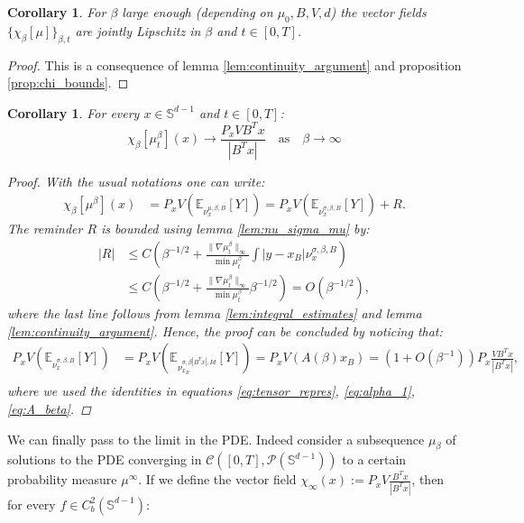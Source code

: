 \documentclass{article}
\numberwithin{theorem}{section}
\newtheorem{corollary}[theorem]{Corollary}
\begin{document}
\begin{corollary}
\label{cor:equilip}
    For $\beta$ large enough (depending on $\mu_0, B, V, d$) the vector fields $\{\chi_\beta[\mu]\}_{\beta,t}$ are jointly Lipschitz in $\beta$ and $t\in[0,T]$.
\end{corollary}
\begin{proof}
    This is a consequence of lemma \ref{lem:continuity_argument} and proposition \ref{prop:chi_bounds}.
\end{proof}

\begin{corollary}
\label{cor:pointwise_limit}
 For every $x\in \mathbb{S}^{d-1}$ and $t\in [0,T]$:
 $$
 \chi_\beta[\mu^\beta_t](x)\to \frac{P_x V B^Tx}{|B^Tx|}\quad \text{as}\quad \beta\to\infty
 $$
 \begin{proof}
     With the usual notations one can write:
     \begin{align*}
         \chi_\beta[\mu^\beta](x)&=P_xV\left( \mathbb{E}_{\nu_x^{\mu,\beta, B}} [Y]\right)= P_xV\left( \mathbb{E}_{\nu_x^{\sigma,\beta, B}} [Y]\right)+R.
     \end{align*}
     The reminder $R$ is bounded using lemma \ref{lem:nu_sigma_mu} by:
          \begin{align*}
       |R|&\leq C\left(\beta^{-1/2}+\frac{\|\nabla \mu^\beta_t\|_\infty}{\min \mu^\beta_t}\int |y-x_B| \nu_x^{\sigma,\beta, B}\right)\\
       &\leq C\left(\beta^{-1/2}+\frac{\|\nabla \mu^\beta_t\|_\infty}{\min \mu^\beta_t}\beta^{-1/2}\right)=O(\beta^{-1/2}),
     \end{align*}
     where the last line follows from lemma \ref{lem:integral_estimates} and lemma \ref{lem:continuity_argument}. Hence, the proof can be concluded by noticing that: 
     \begin{align*}
         P_xV\left( \mathbb{E}_{\nu_x^{\sigma,\beta, B}}[Y]\right)&=P_xV\left(\mathbb{E}_{\nu_{x_B}^{\sigma,\beta |B^Tx|, Id}}[Y] \right)=P_xV (A(\beta) x_B)=(1+O(\beta^{-1})) P_x\frac{VB^Tx}{|B^Tx|},\\
     \end{align*}
     where we used the identities in equations \ref{eq:tensor_repres}, \ref{eq:alpha_1}, \ref{eq:A_beta}.
 \end{proof}
\end{corollary}
We can finally pass to the limit in the PDE. Indeed consider a subsequence $\mu_\beta$ of solutions to the PDE converging in $\mathcal{C}([0,T],\mathcal{P}(\mathbb{S}^{d-1}))$ to a certain probability measure $\mu^\infty$. If we define the vector field $\chi_\infty(x):=P_x V\frac{B^Tx}{|B^Tx|}$, then for every $f\in C^2_b(\mathbb{S}^{d-1})$:
\end{document}
